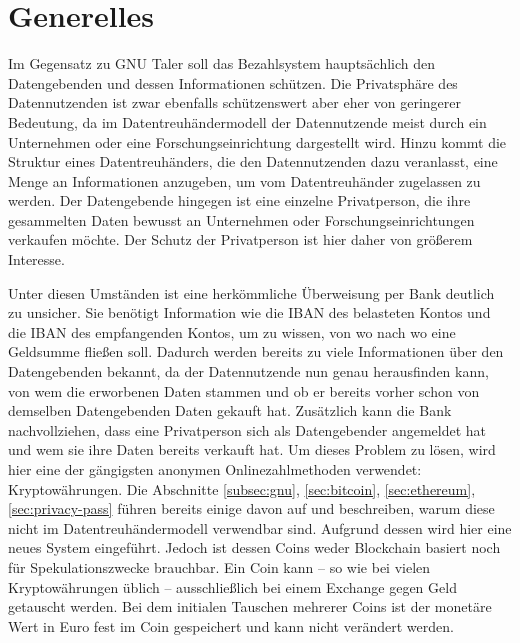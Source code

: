 \documentclass[
	fontsize=12pt,
	headings=small,
	parskip=half,           %
	bibliography=totoc,
	numbers=noenddot,       %
	open=any,               %
]{scrreprt}
\begin{document}
 

\section{Generelles}
Im Gegensatz zu GNU Taler soll das Bezahlsystem hauptsächlich den Datengebenden und dessen Informationen schützen. Die Privatsphäre des Datennutzenden ist zwar ebenfalls schützenswert aber eher von geringerer Bedeutung, da im Datentreuhändermodell der Datennutzende meist durch ein Unternehmen oder eine Forschungseinrichtung dargestellt wird. Hinzu kommt die Struktur eines Datentreuhänders, die den Datennutzenden dazu veranlasst, eine Menge an Informationen anzugeben, um vom Datentreuhänder zugelassen zu werden. Der Datengebende hingegen ist eine einzelne Privatperson, die ihre gesammelten Daten bewusst an Unternehmen oder Forschungseinrichtungen verkaufen möchte. Der Schutz der Privatperson ist hier daher von größerem Interesse. 

Unter diesen Umständen ist eine herkömmliche Überweisung per Bank deutlich zu unsicher. Sie benötigt Information wie die IBAN des belasteten Kontos und die IBAN des empfangenden Kontos, um zu wissen, von wo nach wo eine Geldsumme fließen soll. Dadurch werden bereits zu viele Informationen über den Datengebenden bekannt, da der Datennutzende nun genau herausfinden kann, von wem die erworbenen Daten stammen und ob er bereits vorher schon von demselben Datengebenden Daten gekauft hat. Zusätzlich kann die Bank nachvollziehen, dass eine Privatperson sich als Datengebender angemeldet hat und wem sie ihre Daten bereits verkauft hat.
Um dieses Problem zu lösen, wird hier eine der gängigsten anonymen Onlinezahlmethoden verwendet: Kryptowährungen. Die Abschnitte \ref{subsec:gnu}, \ref{sec:bitcoin}, \ref{sec:ethereum}, \ref{sec:privacy-pass} führen bereits einige davon auf und beschreiben, warum diese nicht im Datentreuhändermodell verwendbar sind. Aufgrund dessen wird hier eine neues System eingeführt. Jedoch ist dessen Coins weder Blockchain basiert noch für Spekulationszwecke brauchbar. Ein Coin kann -- so wie bei vielen Kryptowährungen üblich -- ausschließlich bei einem Exchange gegen Geld getauscht werden. Bei dem initialen Tauschen mehrerer Coins ist der monetäre Wert in Euro fest im Coin gespeichert und kann nicht verändert werden. 
\end{document}
